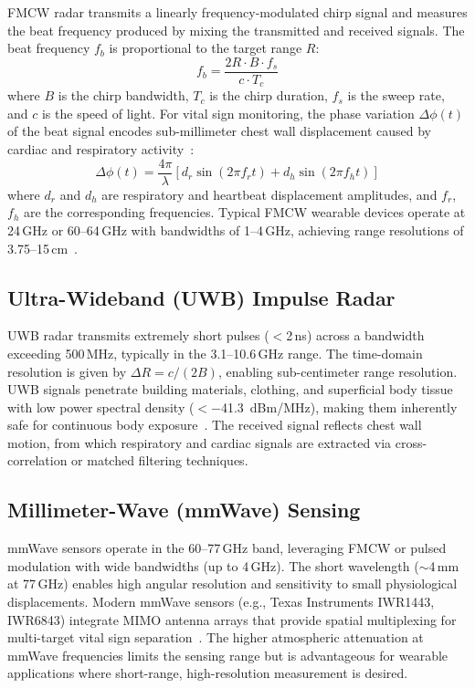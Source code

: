 \documentclass[journal,twoside]{IEEEtran}
\begin{document}
FMCW radar transmits a linearly frequency-modulated chirp signal and measures the beat frequency produced by mixing the transmitted and received signals. The beat frequency $f_b$ is proportional to the target range $R$:
\begin{equation}
f_b = \frac{2R \cdot B \cdot f_s}{c \cdot T_c}
\label{eq:fmcw}
\end{equation}
where $B$ is the chirp bandwidth, $T_c$ is the chirp duration, $f_s$ is the sweep rate, and $c$ is the speed of light. For vital sign monitoring, the phase variation $\Delta\phi(t)$ of the beat signal encodes sub-millimeter chest wall displacement caused by cardiac and respiratory activity~\cite{ref_fmcw_contactless2025}:
\begin{equation}
\Delta\phi(t) = \frac{4\pi}{\lambda}\left[d_r\sin(2\pi f_r t) + d_h\sin(2\pi f_h t)\right]
\end{equation}
where $d_r$ and $d_h$ are respiratory and heartbeat displacement amplitudes, and $f_r$, $f_h$ are the corresponding frequencies. Typical FMCW wearable devices operate at 24\,GHz or 60--64\,GHz with bandwidths of 1--4\,GHz, achieving range resolutions of 3.75--15\,cm~\cite{ref_multiscenario2025}.

\subsection{Ultra-Wideband (UWB) Impulse Radar}

UWB radar transmits extremely short pulses ($<$2\,ns) across a bandwidth exceeding 500\,MHz, typically in the 3.1--10.6\,GHz range. The time-domain resolution is given by $\Delta R = c/(2B)$, enabling sub-centimeter range resolution. UWB signals penetrate building materials, clothing, and superficial body tissue with low power spectral density ($<$\SI{-41.3}{dBm/MHz}), making them inherently safe for continuous body exposure~\cite{ref_uwb_overview2024}. The received signal reflects chest wall motion, from which respiratory and cardiac signals are extracted via cross-correlation or matched filtering techniques.

\subsection{Millimeter-Wave (mmWave) Sensing}

mmWave sensors operate in the 60--77\,GHz band, leveraging FMCW or pulsed modulation with wide bandwidths (up to 4\,GHz). The short wavelength ($\sim$4\,mm at 77\,GHz) enables high angular resolution and sensitivity to small physiological displacements. Modern mmWave sensors (e.g., Texas Instruments IWR1443, IWR6843) integrate MIMO antenna arrays that provide spatial multiplexing for multi-target vital sign separation~\cite{ref_multipoint2024}. The higher atmospheric attenuation at mmWave frequencies limits the sensing range but is advantageous for wearable applications where short-range, high-resolution measurement is desired.
\end{document}
